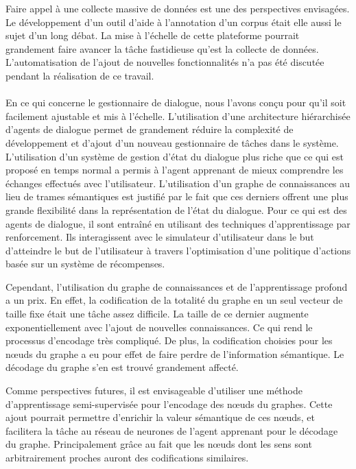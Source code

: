 Faire appel à une collecte massive de données est une des perspectives envisagées. Le développement d'un outil d'aide à l'annotation d'un corpus était elle aussi le sujet d'un long débat. La mise à l'échelle de cette plateforme pourrait grandement faire avancer la tâche fastidieuse qu'est la collecte de données. 
L'automatisation de l'ajout de nouvelles fonctionnalités n'a pas été discutée pendant la réalisation de ce travail.
\paragraph{}
En ce qui concerne le gestionnaire de dialogue, nous l'avons conçu pour qu'il soit facilement ajustable et mis à l'échelle. L'utilisation d'une architecture hiérarchisée d'agents de dialogue permet de grandement réduire la complexité de développement et d'ajout d'un nouveau gestionnaire de tâches dans le système. L'utilisation d'un système de gestion d'état du dialogue plus riche que ce qui est proposé en temps normal a permis à l'agent apprenant de mieux comprendre les échanges effectués avec l'utilisateur. L'utilisation d'un graphe de connaissances au lieu de trames sémantiques est justifié par le fait que ces derniers offrent une plus grande flexibilité dans la représentation de l'état du dialogue. Pour ce qui est des agents de dialogue, il sont entraîné en utilisant des techniques d'apprentissage par renforcement. Ils interagissent avec le simulateur d'utilisateur dans le but d'atteindre le but de l'utilisateur à travers l'optimisation d'une politique d'actions basée sur un système de récompenses.

Cependant, l'utilisation du graphe de connaissances et de l'apprentissage profond a un prix. En effet, la codification de la totalité du graphe en un seul vecteur de taille fixe était une tâche assez difficile. La taille de ce dernier augmente exponentiellement avec l'ajout de nouvelles connaissances. Ce qui rend le processus d'encodage très compliqué. De plus, la codification choisies pour les n\oe{}uds du graphe a eu pour effet de faire perdre de l'information sémantique. Le décodage du graphe s'en est trouvé grandement affecté.

Comme perspectives futures, il est envisageable d'utiliser une méthode d'apprentissage semi-supervisée pour l'encodage des n\oe{}uds du graphes. Cette ajout pourrait permettre d'enrichir la valeur sémantique de ces n\oe{}uds, et facilitera la tâche au réseau de neurones de l'agent apprenant pour le décodage du graphe. Principalement grâce au fait que les n\oe{}uds dont les sens sont arbitrairement proches auront des codifications similaires.

